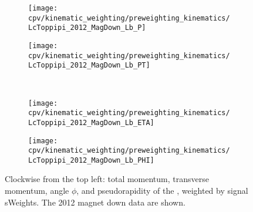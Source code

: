 \begin{sidewaystable}
  \centering
  \caption{%
    Statistics computed on the weighted \ppipi\ data for all data sub-samples 
    used in the analysis.
    The quantities are defined in \cref{chap:cpv:kinematic_weighting:stats}.
  }
  \label{tab:cpv:kinematic_weighting:validation:stats}
  
\end{sidewaystable}

\clearpage

\begin{figure}
  \begin{subfigure}[b]{0.4\textwidth}
    \texttt{[image: cpv/kinematic\_weighting/preweighting\_kinematics/LcToppipi\_2012\_MagDown\_Lb\_P]}
    \label{fig:cpv:kinematic_weighting:pre:Lb:P}
  \end{subfigure}
  \begin{subfigure}[b]{0.4\textwidth}
    \texttt{[image: cpv/kinematic\_weighting/preweighting\_kinematics/LcToppipi\_2012\_MagDown\_Lb\_PT]}
    \label{fig:cpv:kinematic_weighting:pre:Lb:PT}
  \end{subfigure}\\
  \begin{subfigure}[b]{0.4\textwidth}
    \texttt{[image: cpv/kinematic\_weighting/preweighting\_kinematics/LcToppipi\_2012\_MagDown\_Lb\_ETA]}
    \label{fig:cpv:kinematic_weighting:pre:Lb:ETA}
  \end{subfigure}
  \begin{subfigure}[b]{0.4\textwidth}
    \texttt{[image: cpv/kinematic\_weighting/preweighting\_kinematics/LcToppipi\_2012\_MagDown\_Lb\_PHI]}
    \label{fig:cpv:kinematic_weighting:pre:Lb:PHI}
  \end{subfigure}
  \caption{%
    Clockwise from the top left: total momentum, transverse momentum, angle 
    $\phi$, and pseudorapidity of the \PLambdab, weighted by signal sWeights.
    The 2012 magnet down data are shown.
  }
  \label{fig:cpv:kinematic_weighting:pre:Lb}
\end{figure}

